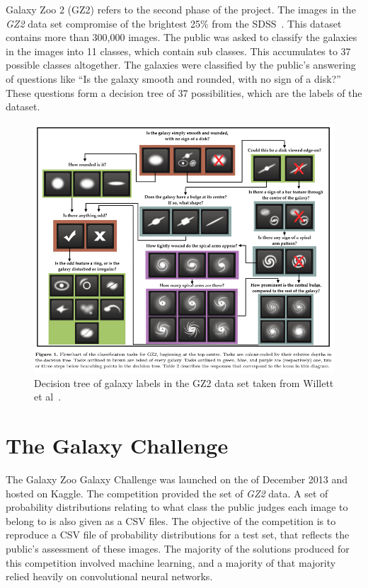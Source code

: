 \documentclass[12pt,a4paper,oneside,oldfontcommands]{memoir}
\begin{document}
\begin{Declaration Of OriginalityOrginality}
Galaxy Zoo 2 (GZ2) refers to the second phase of the project. The images in the \textit{GZ2} data set compromise of the brightest 25\% from the SDSS~\cite{Willett}. This dataset contains more than 300,000 images. The public was asked to classify the galaxies in the images into 11 classes, which contain sub classes. This accumulates to 37 possible classes altogether. The galaxies were classified by the public’s answering of questions like “Is the galaxy smooth and rounded, with no sign of a disk?” These questions form a decision tree of 37 possibilities, which are the labels of the dataset. 

    \begin{figure}[ht]
    \center
      \includegraphics[width=\linewidth]{images/gz-2-decision-tree.png}
      \caption{Decision tree of galaxy labels in the GZ2 data set taken from Willett et al~\cite{Willett}.}
      \label{fig:GZ2-Decision-Tree}
    \end{figure}

\section{The Galaxy Challenge}

The Galaxy Zoo Galaxy Challenge was launched on the  of December 2013 and hosted on Kaggle. The competition provided the set of \textit{GZ2} data. A set of probability distributions relating to what class the public judges each image to belong to is also given as a CSV files. The objective of the competition is to reproduce a CSV file of probability distributions for a test set, that reflects the public's assessment of these images. The majority of the solutions produced for this competition involved machine learning, and a majority of that majority relied heavily on convolutional neural networks.


\end{Declaration Of OriginalityOrginality}
\end{document}
